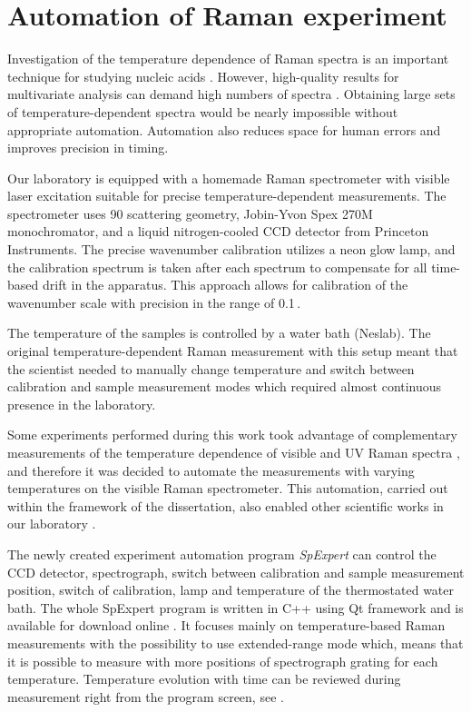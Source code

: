 \section{Automation of Raman experiment}

Investigation of the temperature dependence of Raman spectra is an important
technique for studying nucleic acids
\parencite{Klener2021}.
However, high-quality results for multivariate analysis can demand high numbers
of spectra
\parencite{Palacky2020}.
Obtaining large sets of temperature-dependent spectra would be nearly
impossible without appropriate automation.
Automation also reduces space for human errors and improves precision in
timing.

Our laboratory is equipped with a homemade Raman spectrometer with visible
laser excitation suitable for precise temperature-dependent measurements.
The spectrometer uses 90\textdegree{} scattering geometry, Jobin-Yvon Spex 270M
monochromator, and a liquid nitrogen-cooled CCD detector from Princeton
Instruments.
The precise wavenumber calibration utilizes a neon glow lamp, and the
calibration spectrum is taken after each spectrum to compensate for all
time-based drift in the apparatus.
This approach allows for calibration of the wavenumber scale with precision in
the range of 0.1\,\icm{}.

The temperature of the samples is controlled by a water bath (Neslab).
The original
temperature-dependent Raman measurement with this setup meant that the
scientist needed to manually change temperature and switch between calibration
and sample measurement modes which required almost continuous presence
in the laboratory.

Some experiments performed during this work took advantage of complementary
measurements of the temperature dependence of visible and UV Raman spectra
\parencite{Klener2021},
and therefore it was decided to automate the measurements with varying
temperatures on the visible Raman spectrometer.
This automation, carried out within the framework of the dissertation, also
enabled other scientific works in our laboratory
\parencite{%
	Mudronova2016,%
	Bravo2018,%
	Palacky2020%
}.

The newly created experiment automation program \emph{SpExpert} can control the
CCD detector, spectrograph, switch between calibration and sample measurement
position, switch of calibration, lamp and temperature of the thermostated
water bath.
The whole SpExpert program is written in C++ using Qt framework
\parencite{Qt}
and is available for download online
\parencite{SpExpert2018}.
It focuses mainly on temperature-based Raman measurements with the possibility
to use extended-range mode which, means that it is possible to measure with
more positions of spectrograph grating for each temperature.
Temperature evolution with time can be reviewed during measurement right
from the program screen, see
.

